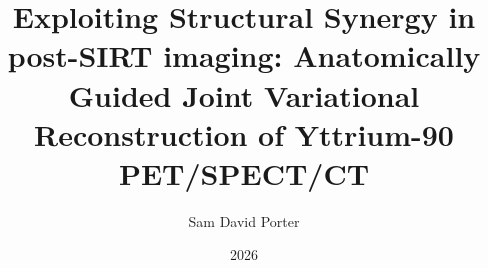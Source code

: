 
\title{Exploiting Structural Synergy in post-SIRT imaging: Anatomically Guided Joint Variational Reconstruction of Yttrium-90 PET/SPECT/CT}
\author{Sam David Porter}
\date{2026}

\maketitle

